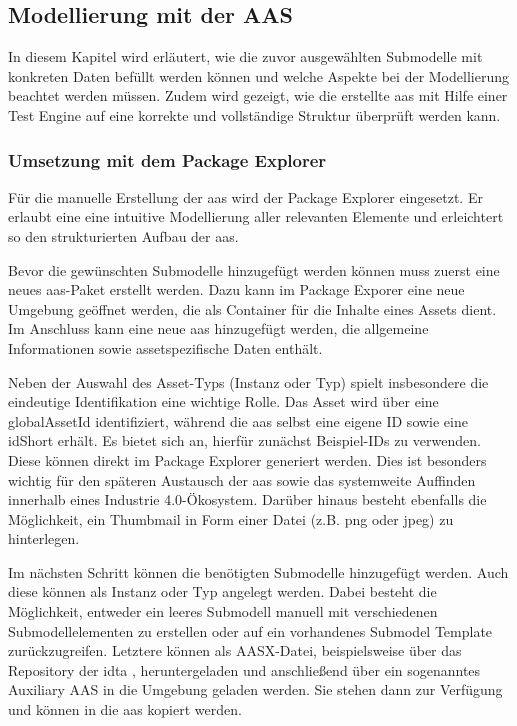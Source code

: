 \subsection{Modellierung mit der AAS}
In diesem Kapitel wird erläutert, wie die zuvor ausgewählten Submodelle mit konkreten Daten befüllt werden können und welche Aspekte bei der Modellierung beachtet werden müssen.
Zudem wird gezeigt, wie die erstellte \acs{aas} mit Hilfe einer Test Engine auf eine korrekte und vollständige Struktur überprüft werden kann. 
\subsubsection{Umsetzung mit dem Package Explorer}
Für die manuelle Erstellung der \acs{aas} wird der Package Explorer eingesetzt.
Er erlaubt eine eine intuitive Modellierung aller relevanten Elemente und erleichtert so den strukturierten Aufbau der \acs{aas}.

Bevor die gewünschten Submodelle hinzugefügt werden können muss zuerst eine neues \acs{aas}-Paket erstellt werden.
Dazu kann im Package Exporer eine neue Umgebung geöffnet werden, die als Container für die Inhalte eines Assets dient.
Im Anschluss kann eine neue \acs{aas} hinzugefügt werden, die allgemeine Informationen sowie assetspezifische Daten enthält.

Neben der Auswahl des Asset-Typs (Instanz oder Typ) spielt insbesondere die eindeutige Identifikation eine wichtige Rolle.
Das Asset wird über eine globalAssetId identifiziert, während die \acs{aas} selbst eine eigene ID sowie eine idShort erhält.
Es bietet sich an, hierfür zunächst Beispiel-IDs zu verwenden. Diese können direkt im Package Explorer generiert werden.
Dies ist besonders wichtig für den späteren Austausch der \acs{aas} sowie das systemweite Auffinden innerhalb eines Industrie 4.0-Ökosystem.
Darüber hinaus besteht ebenfalls die Möglichkeit, ein Thumbmail in Form einer Datei (z.B. png oder jpeg) zu hinterlegen.

Im nächsten Schritt können die benötigten Submodelle hinzugefügt werden. 
Auch diese können als Instanz oder Typ angelegt werden.
Dabei besteht die Möglichkeit, entweder ein leeres Submodell manuell mit verschiedenen Submodellelementen zu erstellen oder auf ein vorhandenes Submodel Template zurückzugreifen.
Letztere können als AASX-Datei, beispielsweise über das Repository der \acs{idta} \cite{idtaTemplates}, heruntergeladen und anschließend über ein sogenanntes Auxiliary AAS in die Umgebung geladen werden.
Sie stehen dann zur Verfügung und können in die \acs{aas} kopiert werden.

